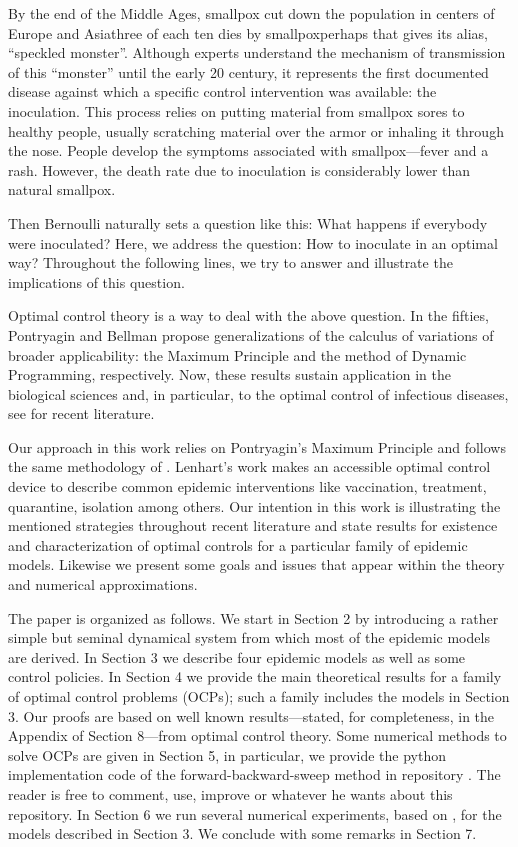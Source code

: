   By the end of the Middle Ages, smallpox cut down the 
population in centers of Europe and Asia\textemdash three of each ten dies by 
smallpox\textemdash perhaps that gives its alias, ``speckled monster''.  
Although experts understand the mechanism of transmission of this  ``monster''
until the early 20  century, it represents the first documented disease
\citep[][]{bernoulli1760essai, bradley1971smallpox, Foppa2017} against which a
specific control intervention was available: the inoculation. This process
relies on putting material from smallpox sores to healthy people, usually scratching
material over the armor or inhaling it through the nose. People develop the
symptoms associated with smallpox---fever and a rash. However, the death rate
due to inoculation is considerably lower than natural smallpox.

  Then Bernoulli naturally sets a question like this: What happens if everybody
were inoculated? Here, we address the question: How to inoculate in an optimal
way? Throughout the following lines, we try to answer and illustrate the
implications of this question. 

  Optimal control theory is a way to deal with the above question.  In the
fifties, Pontryagin and Bellman propose generalizations of the calculus of
variations of broader applicability:  the Maximum Principle and the method of
Dynamic Programming, respectively. Now, these results sustain application in the
biological sciences and, in particular, to the optimal control
of infectious diseases, see  \cite{Yu2018,Lahrouz2018,Jang2018,Cai2017b}
for recent literature.

  Our approach in this work relies on Pontryagin's Maximum
Principle \cite{pontryagin1962} and follows the same methodology of
\citet{lenhart2007optimal}. Lenhart's work makes an accessible optimal control
device to describe common epidemic interventions like vaccination, treatment,
quarantine, isolation among others. Our intention in this work is illustrating
the mentioned strategies throughout recent literature and state results for
existence and characterization of optimal controls for a particular family of epidemic models.
Likewise we present some goals and issues that appear within the
 theory and numerical approximations. 
 
 The paper is organized as follows. We start in Section 2 by introducing a rather simple but seminal dynamical system from which most of the epidemic models are derived. In Section 3 we describe four epidemic models as well as some control policies. In Section 4 we provide the main theoretical results for a family of optimal control problems (OCPs); such a family includes the models in Section 3. Our proofs are based on well known results---stated, for completeness, in the Appendix of Section 8---from optimal control theory. Some numerical methods to solve OCPs are given in Section 5, in particular, we provide 
the python implementation code of the forward-backward-sweep method in repository \cite{python_repo}. The reader is free to comment, use, improve or whatever he wants about this repository. In Section 6 we run several numerical experiments, based on \cite{python_repo}, for the models described in Section 3. We conclude with some remarks in Section 7.
 
